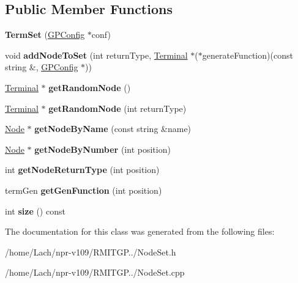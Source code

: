 \subsection*{Public Member Functions}
\begin{DoxyCompactItemize}
\item 
\hypertarget{classTermSet_a6626428386a4a92fa1e5846461f74db9}{}\label{classTermSet_a6626428386a4a92fa1e5846461f74db9} 
{\bfseries Term\+Set} (\hyperlink{classGPConfig}{G\+P\+Config} $\ast$conf)
\item 
\hypertarget{classTermSet_acde80a095d3a4142c808319ada1bb0a2}{}\label{classTermSet_acde80a095d3a4142c808319ada1bb0a2} 
void {\bfseries add\+Node\+To\+Set} (int return\+Type, \hyperlink{classTerminal}{Terminal} $\ast$($\ast$generate\+Function)(const string \&, \hyperlink{classGPConfig}{G\+P\+Config} $\ast$))
\item 
\hypertarget{classTermSet_a1df3090829c02505245aa588101f3a2a}{}\label{classTermSet_a1df3090829c02505245aa588101f3a2a} 
\hyperlink{classTerminal}{Terminal} $\ast$ {\bfseries get\+Random\+Node} ()
\item 
\hypertarget{classTermSet_a4e358dc1dc6258525ccb897aad9ea023}{}\label{classTermSet_a4e358dc1dc6258525ccb897aad9ea023} 
\hyperlink{classTerminal}{Terminal} $\ast$ {\bfseries get\+Random\+Node} (int return\+Type)
\item 
\hypertarget{classTermSet_aceb437fed13a68bd29220ad16bb49a8e}{}\label{classTermSet_aceb437fed13a68bd29220ad16bb49a8e} 
\hyperlink{classNode}{Node} $\ast$ {\bfseries get\+Node\+By\+Name} (const string \&name)
\item 
\hypertarget{classTermSet_aa3b874f5a8e996718690890cf19f3fdf}{}\label{classTermSet_aa3b874f5a8e996718690890cf19f3fdf} 
\hyperlink{classNode}{Node} $\ast$ {\bfseries get\+Node\+By\+Number} (int position)
\item 
\hypertarget{classTermSet_add2e6e37b0e844830caa89d60b52df73}{}\label{classTermSet_add2e6e37b0e844830caa89d60b52df73} 
int {\bfseries get\+Node\+Return\+Type} (int position)
\item 
\hypertarget{classTermSet_a06f3e9b6862dc7fcda266b9b98c158be}{}\label{classTermSet_a06f3e9b6862dc7fcda266b9b98c158be} 
term\+Gen {\bfseries get\+Gen\+Function} (int position)
\item 
\hypertarget{classTermSet_ac7e3c0273f2e071a52da61ef6b016af2}{}\label{classTermSet_ac7e3c0273f2e071a52da61ef6b016af2} 
int {\bfseries size} () const
\end{DoxyCompactItemize}


The documentation for this class was generated from the following files\+:\begin{DoxyCompactItemize}
\item 
/home/\+Lach/npr-\/v109/\+R\+M\+I\+T\+G\+P../Node\+Set.\+h\item 
/home/\+Lach/npr-\/v109/\+R\+M\+I\+T\+G\+P../Node\+Set.\+cpp\end{DoxyCompactItemize}
